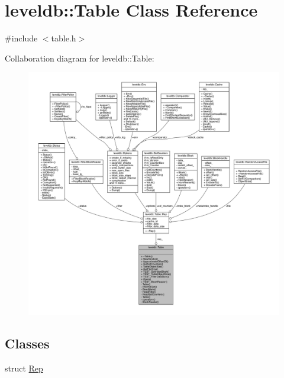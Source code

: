 \hypertarget{classleveldb_1_1_table}{}\section{leveldb\+:\+:Table Class Reference}
\label{classleveldb_1_1_table}


{\ttfamily \#include $<$table.\+h$>$}



Collaboration diagram for leveldb\+:\+:Table\+:
\nopagebreak
\begin{figure}[H]
\begin{center}
\leavevmode
\includegraphics[width=350pt]{classleveldb_1_1_table__coll__graph}
\end{center}
\end{figure}
\subsection*{Classes}
\begin{DoxyCompactItemize}
\item 
struct \hyperlink{structleveldb_1_1_table_1_1_rep}{Rep}
\end{DoxyCompactItemize}
